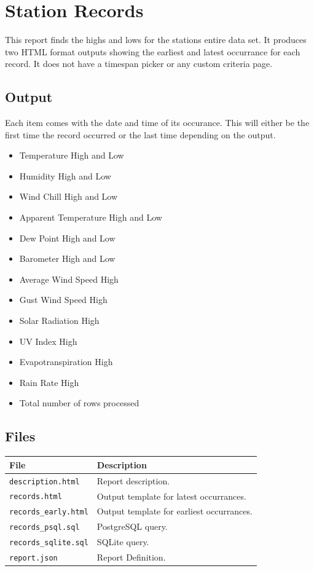 \documentclass[a4paper,10pt]{book}
\begin{document}
\section{Station Records}
This report finds the highs and lows for the stations entire data set. It produces two HTML format outputs showing the earliest and latest occurrance for each record. It does not have a timespan picker or any custom criteria page.

\subsection{Output}
Each item comes with the date and time of its occurance. This will either be the first time the record occurred or the last time depending on the output.
\begin{itemize}
\item Temperature High and Low
\item Humidity High and Low
\item Wind Chill High and Low
\item Apparent Temperature High and Low
\item Dew Point High and Low
\item Barometer High and Low
\item Average Wind Speed High
\item Gust Wind Speed High
\item Solar Radiation High
\item UV Index High
\item Evapotranspiration High
\item Rain Rate High
\item Total number of rows processed
\end{itemize}

\subsection{Files}
\begin{tabular}{p{4.5cm} l}
\hline
\textbf{File} & \textbf{Description} \\
\hline
\verb|description.html| & Report description. \\
\verb|records.html| & Output template for latest occurrances.\\
\verb|records_early.html| & Output template for earliest occurrances.\\
\verb|records_psql.sql| & PostgreSQL query.\\
\verb|records_sqlite.sql| & SQLite query.\\
\verb|report.json| & Report Definition.\\
\hline
\end{tabular}
\end{document}
